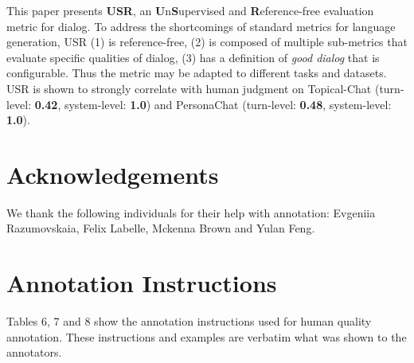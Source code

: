 \documentclass[11pt,a4paper]{article}
\begin{document}
This paper presents \textbf{USR}, an \textbf{U}n\textbf{S}upervised and \textbf{R}eference-free evaluation metric for dialog. To address the shortcomings of standard metrics for language generation, USR (1) is reference-free, (2) is composed of multiple sub-metrics that evaluate specific qualities of dialog, (3) has a definition of \textit{good dialog} that is configurable. 
Thus the metric may be adapted to different tasks and datasets. 
USR is shown to strongly correlate with human judgment on Topical-Chat (turn-level: \textbf{0.42}, system-level: \textbf{1.0}) and PersonaChat  (turn-level: \textbf{0.48}, system-level: \textbf{1.0}). 



\section{Acknowledgements}

We thank the following individuals for their help with annotation: Evgeniia Razumovskaia, Felix Labelle, Mckenna Brown and Yulan Feng.










\clearpage
\appendix
\section{Annotation Instructions}

Tables 6, 7 and 8 show the annotation instructions used for human quality annotation. These instructions and examples are verbatim what was shown to the annotators. 
\end{document}
